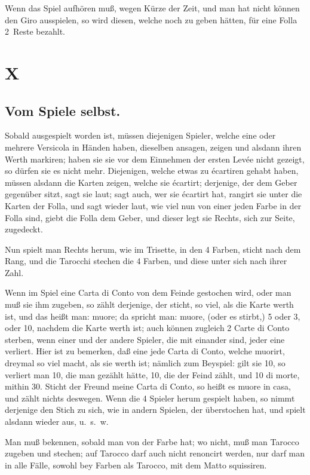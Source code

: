 \documentclass[11pt,a6paper,twoside]{article}
\begin{document}
Wenn das Spiel aufhören muß, wegen Kürze der Zeit, und man hat nicht können den Giro ausspielen, so wird diesen, welche noch zu geben hätten, für eine Folla 2~Reste bezahlt.

\section{X}
\subsection{Vom Spiele selbst.}

Sobald ausgespielt worden ist, müssen diejenigen Spieler, welche eine oder mehrere Versicola in Händen haben, dieselben ansagen, zeigen und alsdann ihren Werth markiren; haben sie sie vor dem Einnehmen der ersten Levée nicht gezeigt, so dürfen sie es nicht mehr. Diejenigen, welche etwas zu écartiren gehabt haben, müssen alsdann die Karten zeigen, welche sie écartirt; derjenige, der dem Geber gegenüber sitzt, sagt sie laut; sagt auch, wer sie écartirt hat, rangirt sie unter die Karten der Folla, und sagt wieder laut, wie viel nun von einer jeden Farbe in der Folla sind, giebt die Folla dem Geber, und dieser legt sie Rechts, sich zur Seite, zugedeckt.

Nun spielt man Rechts herum, wie im Trisette, in den 4 Farben, sticht nach dem Rang, und die Tarocchi stechen die 4 Farben, und diese unter sich nach ihrer Zahl.

Wenn im Spiel eine Carta di Conto von dem Feinde gestochen wird, oder man muß sie ihm zugeben, so zählt derjenige, der sticht, so viel, als die Karte werth ist, und das heißt man: muore; da spricht man: muore, (oder es stirbt,) 5 oder 3, oder 10, nachdem die Karte werth ist; auch können zugleich 2 Carte di Conto sterben, wenn einer und der andere Spieler, die mit einander sind, jeder eine verliert. Hier ist zu bemerken, daß eine jede Carta di Conto, welche muorirt, dreymal so viel macht, als sie werth ist; nämlich zum Beyspiel: gilt sie 10, so verliert man 10, die man gezählt hätte, 10, die der Feind zählt, und 10 di morte, mithin 30. Sticht der Freund meine Carta di Conto, so heißt es muore in casa, und zählt nichts deswegen. Wenn die 4 Spieler herum gespielt haben, so nimmt derjenige den Stich zu sich, wie in andern Spielen, der überstochen hat, und spielt alsdann wieder aus, u.~s.~w.

Man muß bekennen, sobald man von der Farbe hat; wo nicht, muß man Tarocco zugeben und stechen; auf Tarocco darf auch nicht renoncirt werden, nur darf man in alle Fälle, sowohl bey Farben als Tarocco, mit dem Matto squissiren.
\end{document}

